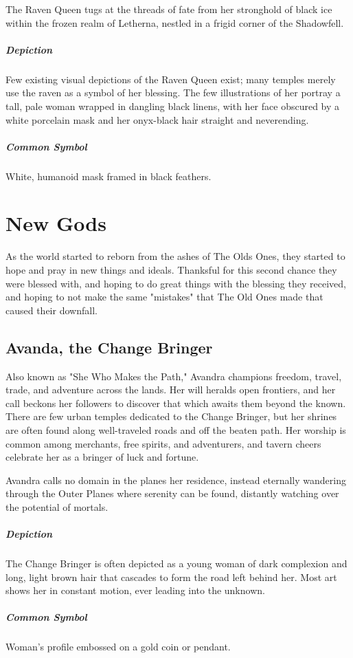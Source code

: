 \documentclass[letterpaper,twocolumn,openany,nodeprecatedcode]{dndbook}
\begin{document}
The Raven Queen tugs at the threads of fate from her stronghold of black ice within the
frozen realm of Letherna, nestled in a frigid corner of the Shadowfell.

\subparagraph{Depiction}
Few existing visual depictions of the Raven Queen exist; many temples merely use the
raven as a symbol of her blessing. The few illustrations of her portray a tall, pale
woman wrapped in dangling black linens, with her face obscured by a white porcelain
mask and her onyx-black hair straight and neverending.

\subparagraph{Common Symbol}
White, humanoid mask framed in black feathers.

\section{New Gods}

As the world started to reborn from the ashes of The Olds Ones, they started to hope and
pray in new things and ideals. Thanksful for this second chance they were blessed with,
and hoping to do great things with the blessing they received, and hoping to not make
the same "mistakes" that The Old Ones made that caused their downfall.

\subsection{Avanda, the Change Bringer}

Also known as "She Who Makes the Path," Avandra champions freedom, travel, trade, and
adventure across the lands. Her will heralds open frontiers, and her call beckons her
followers to discover that which awaits them beyond the known. There are few urban temples
dedicated to the Change Bringer, but her shrines are often found along well-traveled roads
and off the beaten path. Her worship is common among merchants, free spirits, and adventurers,
and tavern cheers celebrate her as a bringer of luck and fortune.

Avandra calls no domain in the planes her residence, instead eternally wandering through the
Outer Planes where serenity can be found, distantly watching over the potential of mortals.

\subparagraph{Depiction}
The Change Bringer is often depicted as a young woman of dark complexion and long, light brown
hair that cascades to form the road left behind her. Most art shows her in constant motion,
ever leading into the unknown.

\subparagraph{Common Symbol}
Woman’s profile embossed on a gold coin or pendant.
\end{document}
